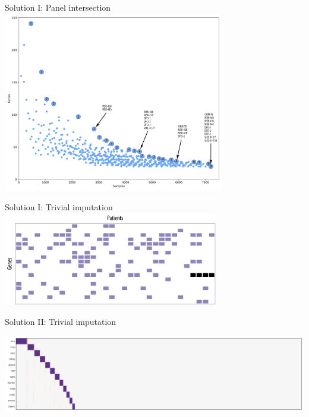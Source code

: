 \documentclass[mathserif]{beamer}
\begin{document}
\begin{frame}{Solution I: Panel intersection}
  \centering
  \includegraphics[width=3.8in]{figures/brca_panels_pareto_annotated.pdf}
\end{frame}

\begin{frame}{Solution I: Trivial imputation}
  \centering
  \includegraphics[width=3.7in]{figures/example1_missing.pdf}
\end{frame}

\begin{frame}{Solution II: Trivial imputation}
  \begin{center}
  \includegraphics[width=\textwidth]{figures/brca_fill.pdf}
  \end{center}
  \vspace{1em}
\end{frame}
\end{document}
